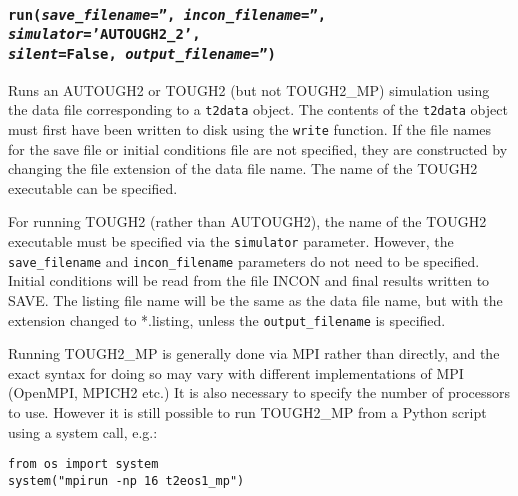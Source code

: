 \begin{snugshade}
\subsubsection{\texttt{run(\emph{save\_filename}='', \emph{incon\_filename}='', \emph{simulator}='AUTOUGH2\_2',\\
    \emph{silent}=False, \emph{output\_filename}='')}}
\end{snugshade}
\label{sec:t2data:run}

Runs an AUTOUGH2 or TOUGH2 (but not TOUGH2\_MP) simulation using the data file corresponding to a \texttt{t2data} object.  The contents of the \texttt{t2data} object must first have been written to disk using the \texttt{write} function.  If the file names for the save file or initial conditions file are not specified, they are constructed by changing the file extension of the data file name.  The name of the TOUGH2 executable can be specified.

For running TOUGH2 (rather than AUTOUGH2), the name of the TOUGH2 executable must be specified via the \texttt{simulator} parameter.  However, the \texttt{save\_filename} and \texttt{incon\_filename} parameters do not need to be specified.  Initial conditions will be read from the file INCON and final results written to SAVE.  The listing file name will be the same as the data file name, but with the extension changed to *.listing, unless the \texttt{output\_filename} is specified.

Running TOUGH2\_MP is generally done via MPI rather than directly, and the exact syntax for doing so may vary with different implementations of MPI (OpenMPI, MPICH2 etc.)  It is also necessary to specify the number of processors to use.  However it is still possible to run TOUGH2\_MP from a Python script using a system call, e.g.:

\begin{lstlisting}
from os import system
system("mpirun -np 16 t2eos1_mp")
\end{lstlisting}

